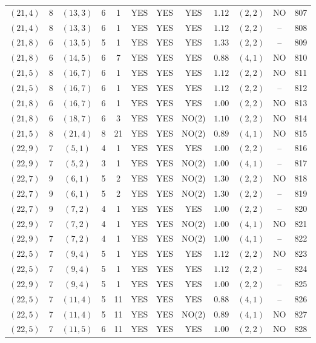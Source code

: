 \begin{longtable}{|c|c|c|c|c|c|c|c|c|c|c|c|}
$(21,4)$ & 8 & $(13,3)$ & 6 & 1 & YES & YES & YES & $1.12$ & $(2,2)$ & NO & 807\\
$(21,4)$ & 8 & $(13,3)$ & 6 & 1 & YES & YES & YES & $1.12$ & $(2,2)$ & -- & 808\\
$(21,8)$ & 6 & $(13,5)$ & 5 & 1 & YES & YES & YES & $1.33$ & $(2,2)$ & -- & 809\\
$(21,8)$ & 6 & $(14,5)$ & 6 & 7 & YES & YES & YES & $0.88$ & $(4,1)$ & NO & 810\\
$(21,5)$ & 8 & $(16,7)$ & 6 & 1 & YES & YES & YES & $1.12$ & $(2,2)$ & NO & 811\\
$(21,5)$ & 8 & $(16,7)$ & 6 & 1 & YES & YES & YES & $1.12$ & $(2,2)$ & -- & 812\\
$(21,8)$ & 6 & $(16,7)$ & 6 & 1 & YES & YES & YES & $1.00$ & $(2,2)$ & NO & 813\\
$(21,8)$ & 6 & $(18,7)$ & 6 & 3 & YES & YES & NO(2) & $1.10$ & $(2,2)$ & NO & 814\\
$(21,5)$ & 8 & $(21,4)$ & 8 & 21 & YES & YES & NO(2) & $0.89$ & $(4,1)$ & NO & 815\\
$(22,9)$ & 7 & $(5,1)$ & 4 & 1 & YES & YES & YES & $1.00$ & $(2,2)$ & -- & 816\\
$(22,9)$ & 7 & $(5,2)$ & 3 & 1 & YES & YES & NO(2) & $1.00$ & $(4,1)$ & -- & 817\\
$(22,7)$ & 9 & $(6,1)$ & 5 & 2 & YES & YES & NO(2) & $1.30$ & $(2,2)$ & NO & 818\\
$(22,7)$ & 9 & $(6,1)$ & 5 & 2 & YES & YES & NO(2) & $1.30$ & $(2,2)$ & -- & 819\\
$(22,7)$ & 9 & $(7,2)$ & 4 & 1 & YES & YES & YES & $1.00$ & $(2,2)$ & -- & 820\\
$(22,9)$ & 7 & $(7,2)$ & 4 & 1 & YES & YES & NO(2) & $1.00$ & $(4,1)$ & NO & 821\\
$(22,9)$ & 7 & $(7,2)$ & 4 & 1 & YES & YES & NO(2) & $1.00$ & $(4,1)$ & -- & 822\\
$(22,5)$ & 7 & $(9,4)$ & 5 & 1 & YES & YES & YES & $1.12$ & $(2,2)$ & NO & 823\\
$(22,5)$ & 7 & $(9,4)$ & 5 & 1 & YES & YES & YES & $1.12$ & $(2,2)$ & -- & 824\\
$(22,9)$ & 7 & $(9,4)$ & 5 & 1 & YES & YES & YES & $1.00$ & $(2,2)$ & -- & 825\\
$(22,5)$ & 7 & $(11,4)$ & 5 & 11 & YES & YES & YES & $0.88$ & $(4,1)$ & -- & 826\\
$(22,5)$ & 7 & $(11,4)$ & 5 & 11 & YES & YES & NO(2) & $0.89$ & $(4,1)$ & NO & 827\\
$(22,5)$ & 7 & $(11,5)$ & 6 & 11 & YES & YES & YES & $1.00$ & $(2,2)$ & NO & 828\\

\end{longtable}
